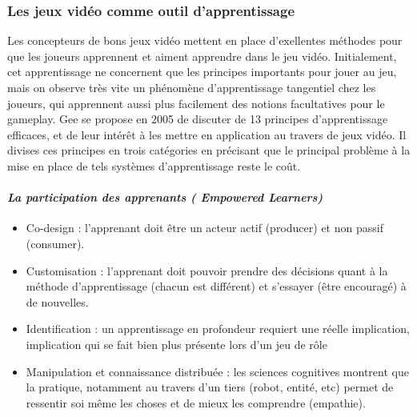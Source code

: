 		\subsubsection*{Les jeux vidéo comme outil d'apprentissage}
Les concepteurs de bons jeux vidéo mettent en place d'exellentes méthodes pour que les joueurs apprennent et aiment apprendre dans le jeu vidéo. Initialement, cet apprentissage ne concernent que les principes importants pour jouer au jeu, mais on observe très vite un phénomène d'apprentissage tangentiel chez les joueurs, qui apprennent aussi plus facilement des notions facultatives pour le gameplay. Gee se propose en 2005 de discuter de 13 principes d'apprentissage efficaces, et de leur intérêt à les mettre en application au travers de jeux vidéo. Il divises ces principes en trois catégories en précisant que le principal problème à la mise en place de tels systèmes d'apprentissage reste le coût.
			\paragraph{\emph{La participation des apprenants ( Empowered Learners)}}
			\begin{itemize}
				\item {Co-design} : l'apprenant doit être un acteur actif (producer) et non passif (consumer).
				\item {Customisation} : l'apprenant doit pouvoir prendre des décisions quant à la méthode d'apprentissage (chacun est différent) et s'essayer (être encouragé) à de nouvelles.
				\item {Identification} : un apprentissage en profondeur requiert une réelle implication, implication qui se fait bien plus présente lors d'un jeu de rôle
				\item {Manipulation et connaissance distribuée} : les sciences cognitives montrent que la pratique, notamment au travers d'un tiers (robot, entité, etc) permet de ressentir soi
même les choses et de mieux les comprendre (empathie).
			\end{itemize}

